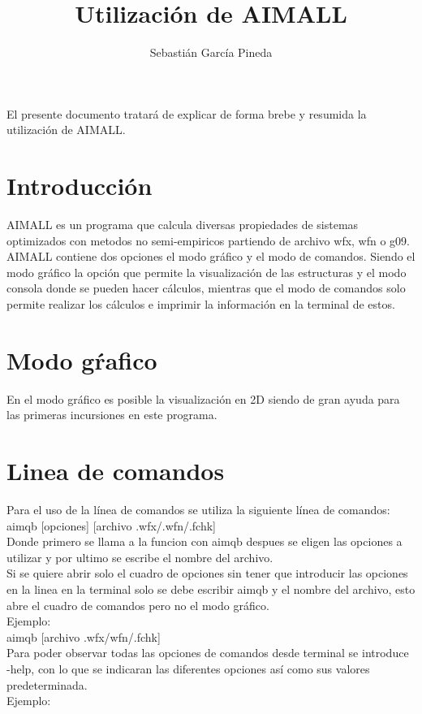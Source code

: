 \documentclass[a4paper,10pt]{article}
\title{Utilización de AIMALL}
\author{Sebastián García Pineda}
\date{}
\begin{document}
\maketitle
El presente documento tratará de explicar de forma brebe y resumida la utilización de AIMALL. \\
\section{Introducción}
AIMALL es un programa que calcula diversas propiedades de sistemas optimizados con metodos no semi-empiricos 
partiendo de archivo wfx, wfn o g09.
AIMALL contiene dos opciones el modo gráfico y el modo de comandos. Siendo el modo gráfico la opción que permite 
la visualización de las estructuras y el modo consola donde se pueden hacer cálculos, mientras que el modo de comandos 
solo permite realizar los cálculos e imprimir la información en la terminal de estos.

\section{Modo gŕafico}
En el modo gráfico es posible la visualización en 2D  siendo de gran ayuda para las primeras incursiones en este programa.


\section{Linea de comandos}
Para el uso de la línea de comandos se utiliza la siguiente línea de comandos: \\

aimqb [opciones] [archivo .wfx/.wfn/.fchk] \\ 

Donde primero se llama a la funcion con aimqb despues se eligen las opciones a utilizar y por ultimo se escribe el
nombre del archivo. \\
Si se quiere abrir solo el cuadro de opciones sin tener que introducir las opciones en la linea en la terminal solo se debe 
escribir aimqb y el nombre del archivo, esto abre el cuadro de comandos pero no el modo gráfico.\\
Ejemplo: \\

aimqb [archivo .wfx/wfn/.fchk]\\   

Para poder observar todas las opciones de comandos desde terminal se introduce -help, con lo que se indicaran las diferentes
opciones así como sus valores predeterminada. \\
Ejemplo:\\
\end{document}
